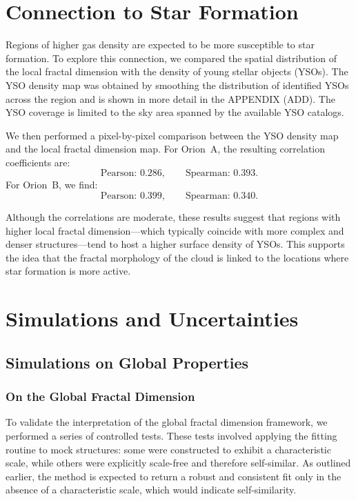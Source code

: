 \section{Connection to Star Formation}

Regions of higher gas density are expected to be more susceptible to star formation.  
To explore this connection, we compared the spatial distribution of the local fractal dimension with the density of young stellar objects (YSOs).  
The YSO density map was obtained by smoothing the distribution of identified YSOs across the region and is shown in more detail in the APPENDIX (ADD).  
The YSO coverage is limited to the sky area spanned by the available YSO catalogs.

We then performed a pixel-by-pixel comparison between the YSO density map and the local fractal dimension map.  
For Orion~A, the resulting correlation coefficients are:
\[
\text{Pearson: } 0.286, \qquad \text{Spearman: } 0.393.
\]
For Orion~B, we find:
\[
\text{Pearson: } 0.399, \qquad \text{Spearman: } 0.340.
\]

Although the correlations are moderate, these results suggest that regions with higher local fractal dimension---which typically coincide with more complex and denser structures---tend to host a higher surface density of YSOs.  
This supports the idea that the fractal morphology of the cloud is linked to the locations where star formation is more active.

\section{Simulations and Uncertainties}

\subsection{Simulations on Global Properties}

\subsubsection{On the Global Fractal Dimension}

To validate the interpretation of the global fractal dimension framework, we performed a series of controlled tests.  
These tests involved applying the fitting routine to mock structures: some were constructed to exhibit a characteristic scale, while others were explicitly scale-free and therefore self-similar.  
As outlined earlier, the method is expected to return a robust and consistent fit only in the absence of a characteristic scale, which would indicate self-similarity.

